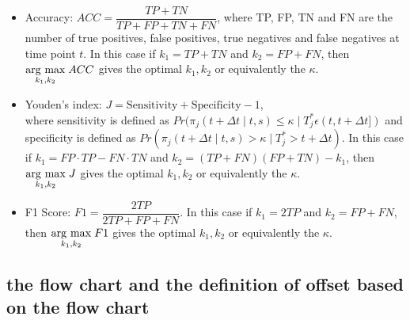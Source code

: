 \begin{itemize}
\item Accuracy: $ACC = \dfrac{TP + TN}{TP + FP + TN + FN}$, where TP, FP, TN and FN are the number of true positives, false positives, true negatives and false negatives at time point $t$. In this case if $k_1 = TP + TN$ and $k_2 = FP + FN$, then $\underset{k_1, k_2}{\operatorname{arg}\,\operatorname{max}}\; ACC$ gives the optimal $k_1, k_2$ or equivalently the $\kappa$.

\item Youden's index: $J = \text{Sensitivity} + \text{Specificity}- 1$,\\
where sensitivity is defined as $Pr(\pi_j(t + \Delta t \mid t,s) \leq \kappa \mid T^*_j \epsilon (t, t + \Delta t])$ and specificity is defined as $Pr(\pi_j(t + \Delta t \mid t,s) > \kappa \mid T^*_j > t + \Delta t)$. In this case if $k_1 = FP \cdot TP - FN \cdot TN$ and $k_2 = (TP+FN)(FP+TN) - k_1$, then $\underset{k_1, k_2}{\operatorname{arg}\,\operatorname{max}}\; J$ gives the optimal $k_1, k_2$ or equivalently the $\kappa$.

\item F1 Score: $F1 = \dfrac{2TP}{2TP + FP + FN}$. In this case if $k_1 = 2TP$ and $k_2 = FP + FN$, then $\underset{k_1, k_2}{\operatorname{arg}\,\operatorname{max}}\; F1$ gives the optimal $k_1, k_2$ or equivalently the $\kappa$.
\end{itemize}

\subsection{the flow chart and the definition of offset based on the flow chart}